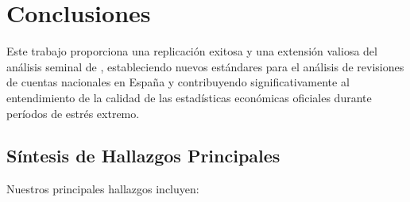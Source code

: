 \documentclass[12pt,a4paper]{article}
\begin{document}
\section{Conclusiones}

Este trabajo proporciona una replicación exitosa y una extensión valiosa del análisis seminal de \citet{pavia2017}, estableciendo nuevos estándares para el análisis de revisiones de cuentas nacionales en España y contribuyendo significativamente al entendimiento de la calidad de las estadísticas económicas oficiales durante períodos de estrés extremo.

\subsection{Síntesis de Hallazgos Principales}

Nuestros principales hallazgos incluyen:
\end{document}
